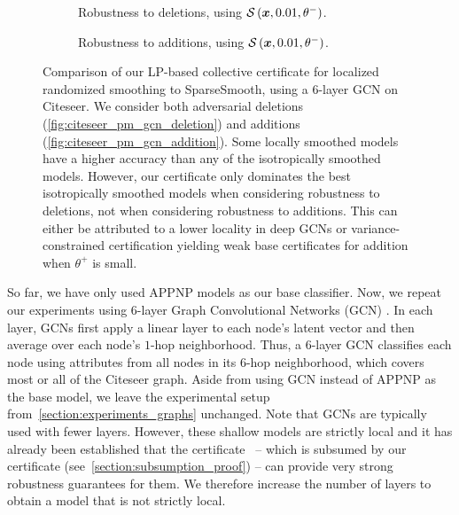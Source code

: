 \begin{figure}[ht]
    \vskip 0.2in
    \centering
    \begin{subfigure}[b]{0.49\textwidth}
        \resizebox{\textwidth}{!}{}
        \caption{
        Robustness to deletions, using $\mathcal{S}\left({\bm{x}}, 0.01, \theta^{-}\right)$.
        }
        \label{fig:citeseer_pm_gcn_deletion}
    \end{subfigure}
    \hfill
    \begin{subfigure}[b]{0.49\textwidth}
        \resizebox{\textwidth}{!}{}
        \caption{
        Robustness to additions, using $\mathcal{S}\left({\bm{x}}, 0.01, \theta^{-}\right)$.
        }
        \label{fig:citeseer_pm_gcn_addition}
    \end{subfigure}
    \caption{Comparison of our LP-based collective certificate for localized randomized smoothing to SparseSmooth, using a $6$-layer GCN on Citeseer. We consider both adversarial deletions (\autoref{fig:citeseer_pm_gcn_deletion}) and additions (\autoref{fig:citeseer_pm_gcn_addition}).
    Some locally smoothed models have a higher accuracy than any of the isotropically smoothed models. However, our certificate only dominates the best isotropically smoothed models when considering robustness to deletions, not when considering robustness to additions.
    This can either be attributed to a lower locality in deep GCNs or variance-constrained certification yielding weak base certificates for addition when $\theta^{+}$ is small.}
    \label{fig:citeseer_pm_gcn}
    \vskip -0.2in
\end{figure}

So far, we have only used APPNP models as our base classifier.
Now, we repeat our experiments using 6-layer Graph Convolutional Networks (GCN) \citep{Kipf2017}.
In each layer, GCNs first apply a linear layer to each node's latent vector and then average over each node's $1$-hop neighborhood.
Thus, a 6-layer GCN classifies each node using attributes from all nodes in its $6$-hop neighborhood, which covers most or all of the Citeseer graph.
Aside from  using GCN instead of APPNP as the base model, we leave the experimental setup from~\autoref{section:experiments_graphs} unchanged.
Note that GCNs are typically used with fewer layers. However, these  shallow models are strictly local and it has already been established that the certificate~\citet{Schuchardt2021} -- which is subsumed by our certificate (see~\autoref{section:subsumption_proof}) -- can provide very strong robustness guarantees for them. We therefore increase the number of layers to obtain a model that is not strictly local.

